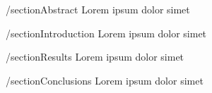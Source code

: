 /section{Abstract}
Lorem ipsum dolor simet

/section{Introduction}
Lorem ipsum dolor simet

/section{Results}
Lorem ipsum dolor simet

/section{Conclusions}
Lorem ipsum dolor simet